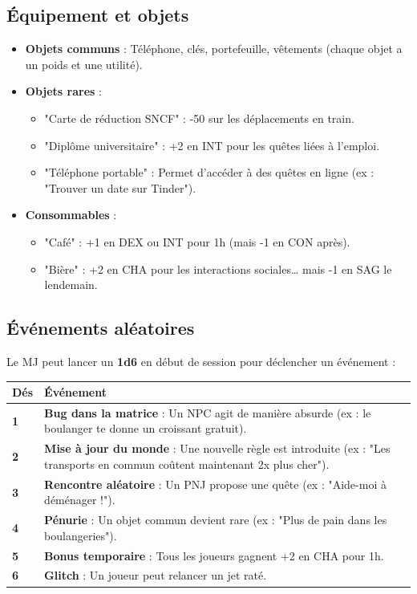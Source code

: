 \documentclass[11pt, a4paper]{article}
\begin{document}
\subsection{Équipement et objets}
\begin{itemize}
    \item \textbf{Objets communs} : Téléphone, clés, portefeuille, vêtements (chaque objet a un poids et une utilité).
    \item \textbf{Objets rares} :
    \begin{itemize}
        \item "Carte de réduction SNCF" : -50 sur les déplacements en train.
        \item "Diplôme universitaire" : +2 en INT pour les quêtes liées à l'emploi.
        \item "Téléphone portable" : Permet d'accéder à des quêtes en ligne (ex : "Trouver un date sur Tinder").
    \end{itemize}
    \item \textbf{Consommables} :
    \begin{itemize}
        \item "Café" : +1 en DEX ou INT pour 1h (mais -1 en CON après).
        \item "Bière" : +2 en CHA pour les interactions sociales… mais -1 en SAG le lendemain.
    \end{itemize}
\end{itemize}

\subsection{Événements aléatoires}
Le MJ peut lancer un \textbf{1d6} en début de session pour déclencher un événement :

\begin{center}
    \begin{tabular}{>{\bfseries}l p{10cm}}
        \toprule
        \textbf{Dés} & \textbf{Événement} 	\\
        \midrule
        1 & \textbf{Bug dans la matrice} : Un NPC agit de manière absurde (ex : le boulanger te donne un croissant gratuit).  	\\
        2 & \textbf{Mise à jour du monde} : Une nouvelle règle est introduite (ex : "Les transports en commun coûtent maintenant 2x plus cher").  	\\
        3 & \textbf{Rencontre aléatoire} : Un PNJ propose une quête (ex : "Aide-moi à déménager !").  	\\
        4 & \textbf{Pénurie} : Un objet commun devient rare (ex : "Plus de pain dans les boulangeries").  	\\
        5 & \textbf{Bonus temporaire} : Tous les joueurs gagnent +2 en CHA pour 1h.  	\\
        6 & \textbf{Glitch} : Un joueur peut relancer un jet raté.  	\\
        \bottomrule
    \end{tabular}
\end{center}
\end{document}
